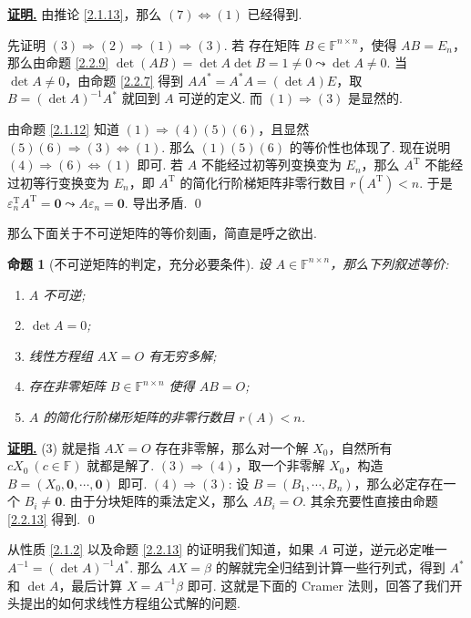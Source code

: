 \documentclass[10pt,openany]{article}
\theoremstyle{thmstyle} %
\theoremstyle{defstyle} %
\theoremstyle{prostyle} %
\newtheorem{proposition}[theorem]{命题}
\theoremstyle{exastyle}
\theoremstyle{remstyle}
\renewenvironment{proof}[1][证明]{\par\underline{\textbf{#1.}} \;\fangsong}{\qed\par}
\newcommand{\T}{^{\text{T}}}
\newcommand{\F}{\mathbb{F}}
\newcommand{\n}{^{n \times n}}
\begin{document}
\begin{proof}
	由推论 \ref{2.1.13}，那么 \( (7) \Leftrightarrow (1) \) 已经得到.
	 
	先证明 \( (3) \Rightarrow (2) \Rightarrow (1) \Rightarrow (3) \). 若 存在矩阵 \( B \in \F\n \)，使得 \( AB=E_n \)，那么由命题 \ref{2.2.9} \( \det(AB)=\det A \det B=1 \neq 0 \leadsto \det A \neq 0 \). 当 \( \det A \neq 0 \)，由命题 \ref{2.2.7} 得到 \( AA^*=A^*A=(\det A) E \)，取 \( B=(\det A)^{-1}A^* \) 就回到 \( A \) 可逆的定义. 而 \( (1) \Rightarrow (3) \) 是显然的.
	
	由命题 \ref{2.1.12} 知道 \( (1)  \Rightarrow (4)(5)(6) \)，且显然 \( (5)(6) \Rightarrow (3) \Leftrightarrow (1) \). 那么 \( (1)(5)(6) \) 的等价性也体现了. 现在说明 \( (4) \Rightarrow (6) \Leftrightarrow (1) \) 即可. 若 \( A \) 不能经过初等列变换变为 \( E_n \)，那么 \( A\T \) 不能经过初等行变换变为 \( E_n \)，即 \( A\T \) 的简化行阶梯矩阵非零行数目 \( r(A\T) <n \). 于是 \( \varepsilon_n\T A\T=\bm{0} \leadsto A\varepsilon_n=\bm{0} \). 导出矛盾.
\end{proof}

那么下面关于不可逆矩阵的等价刻画，简直是呼之欲出.

\begin{proposition}[不可逆矩阵的判定，充分必要条件]	\label{2.2.14}
	设 \( A \in \F\n \)，那么下列叙述等价:
	\begin{enumerate}[(1)]
		\item \( A \) 不可逆;
		\item \( \det A = 0 \);
		\item 线性方程组 \( AX=O \) 有无穷多解;
		\item 存在非零矩阵 \( B \in \F\n \) 使得 \( AB=O \);
		\item \( A \) 的简化行阶梯形矩阵的非零行数目 \( r(A)<n \).
	\end{enumerate}

\end{proposition}

\begin{proof}
	(3) 就是指 \( AX=O \) 存在非零解，那么对一个解 \( X_0 \)，自然所有 \( cX_0 \ (c \in \F) \) 就都是解了. \( (3) \Rightarrow (4) \)，取一个非零解 \( X_0 \)，构造 \( B=(X_0,\bm{0},\cdots,\bm{0}) \) 即可. \( (4) \Rightarrow (3) \): 设 \( B=(B_1,\cdots,B_n) \)，那么必定存在一个 \( B_i \neq \bm{0} \). 由于分块矩阵的乘法定义，那么 \( AB_i=O \). 其余充要性直接由命题 \ref{2.2.13} 得到.
\end{proof}

从性质 \ref{2.1.2} 以及命题 \ref{2.2.13} 的证明我们知道，如果 \( A \) 可逆，逆元必定唯一 \( A^{-1}=(\det A)^{-1} A^* \). 那么 \( AX=\beta \) 的解就完全归结到计算一些行列式，得到 \( A^* \) 和 \( \det A \)，最后计算 \( X=A^{-1}\beta \) 即可. 这就是下面的 Cramer 法则，回答了我们开头提出的如何求线性方程组公式解的问题.
\end{document}
